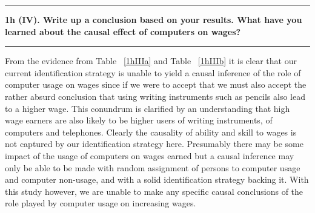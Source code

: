 \documentclass[12pt]{article}
\newcommand\question[1]{\vspace{1em}\hrule\vspace{1em}\textbf{#1}\vspace{1em}\hrule\vspace{1em}}
\begin{document}
\restoregeometry 
\newpage
\question{1h (IV). Write up a conclusion based on your results. What have you learned about the causal effect of computers on wages?}
From the evidence from Table ~\ref{1hIIIa} and Table ~\ref{1hIIIb} it is clear that our current identification strategy is unable to yield a causal inference of the role of computer usage on wages since if we were to accept that we must also accept the rather absurd conclusion that using writing instruments such as pencils also lead to a higher wage. This conundrum is clarified by an understanding that high wage earners are also likely to be higher users of writing instruments, of computers and telephones. Clearly the causality of ability and skill to wages is not captured by our identification strategy here. Presumably there may be some impact of the usage of computers on wages earned but a causal inference may only be able to be made with random assignment of persons to computer usage and computer non-usage, and with a solid identification strategy backing it. With this study however, we are unable to make any specific causal conclusions of the role played by computer usage on increasing wages.



\end{document}
